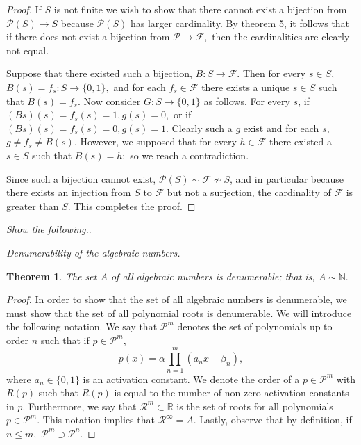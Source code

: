 \documentclass[letter]{article}
\newtheorem{theorem}{Theorem}
\newenvironment{menumerate}{%
  \edef\backupindent{\the\parindent}%
  \enumerate%
  \setlength{\parindent}{\backupindent}%
}{\endenumerate}
\begin{document}
\begin{menumerate}
\begin{menumerate}
\begin{proof}
				If $S$ is not finite we wish to show that there cannot exist a bijection from $\mathcal{P}(S) \to S$ because $\mathcal{P}(S)$ has larger cardinality. By theorem 5, it follows that if there does not exist a bijection from $\mathcal{P} \to \mathcal{F},$ then the cardinalities are clearly not equal.

				Suppose that there existed such a bijection, $B:S\to \mathcal{F}.$ Then for every $s \in S$, $B(s) = f_s: S \to \{0,1\},$ and for each $f_s \in \mathcal{F}$ there exists a unique $s \in S$ such that $B(s) = f_s.$
				Now consider $G:S\to\{0,1\}$ as follows. For every $s$, if $(Bs)(s) = f_s(s) =1, g(s) = 0,$ or if $(Bs)(s) = f_s(s) =0, g(s) = 1.$ Clearly such a $g$ exist and for each $s$, $g \neq f_s \neq B(s)$. However, we supposed that for every $h \in \mathcal{F}$ there existed a $s \in S$ such that $B(s) = h;$ so we reach a contradiction.

				Since such a bijection cannot exist, $\mathcal{P}(S) \sim \mathcal{F} \nsim S$, and in particular because there exists an injection from $S$ to $\mathcal{F}$ but not a surjection, the cardinality of $ \mathcal{F} $ is greater than $S.$ This completes the proof.
				\end{proof}
	 		\end{menumerate}

 		\item \textit{Show the following.}.
	 		\begin{menumerate}
	 		 	\item \textit{Denumerability of the algebraic numbers.} 
	 		 		\begin{theorem}
	 		 			The set $A$ of all algebraic numbers is denumerable; that is, $A \sim \mathbb{N}.$
	 		 		\end{theorem}
	 		 		\begin{proof}
	 		 			In order to show that the set of all algebraic numbers is denumerable, we must show that the set of all polynomial roots is denumerable. We will introduce the following notation. We say that $\mathcal{P}^m$ denotes the set of polynomials up to order $n$ such that if $p\in \mathcal{P}^m$,$$p(x) = \alpha \prod_{n=1}^m(a_nx + \beta_n),$$ where $a_n \in \{0,1\}$ is an activation constant. We denote the order of a $p \in \mathcal{P}^m$ with $R(p)$ such that $R(p)$ is equal to the number of non-zero activation constants in $p.$ Furthermore, we say that $\mathcal{R}^m \subset \mathbb{R}$ is the set of roots for all polynomials $p\in\mathcal{P}^m.$ This notation implies that $\mathcal{R}^\infty = A$. Lastly, observe that by definition, if $n \leq m,$ $\mathcal{P}^m \supset \mathcal{P}^n.$


\end{proof}
\end{menumerate}
\end{menumerate}
\end{document}
